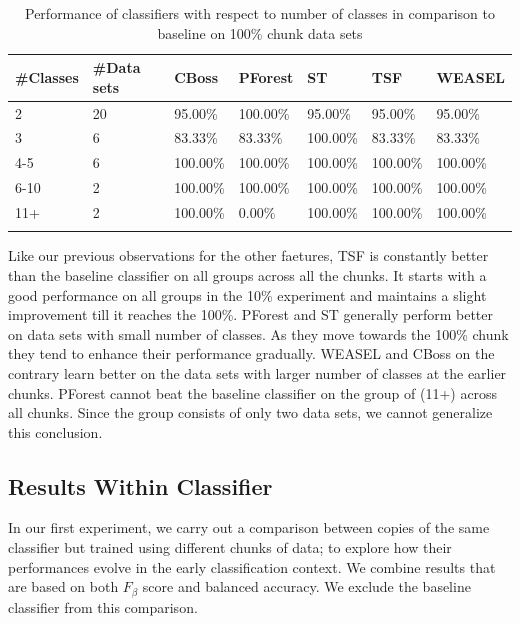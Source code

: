 \begin{table}[hp!]
	\setlength\extrarowheight{2pt} %
	\begin{tabularx}{\textwidth}{|X|X|X|X|X|X|X|}
	\hline
	\textbf{\#Classes} & \textbf{\#Data sets} & \textbf{CBoss} & \textbf{PForest} & \textbf{ST} & \textbf{TSF} & \textbf{WEASEL} \\ \hline
		2 & 20 & 95.00\% & 100.00\% & 95.00\% & 95.00\% & 95.00\% \\ \hline
		3 & 6 & 83.33\% & 83.33\% & 100.00\% & 83.33\% & 83.33\% \\ \hline
		4-5 & 6 & 100.00\% & 100.00\% & 100.00\% & 100.00\% & 100.00\% \\ \hline
		6-10 & 2 & 100.00\% & 100.00\% & 100.00\% & 100.00\% & 100.00\% \\ \hline
		11+ & 2 & 100.00\% & 0.00\% & 100.00\% & 100.00\% & 100.00\% \\ \hline
  \caption{Performance of classifiers with respect to number of classes in comparison to baseline on 100\% chunk data sets}
  \label{TableNumClass100}
  \end{tabularx}
\end{table}

Like our previous observations for the other faetures, TSF is constantly better than the baseline classifier on all groups across all the chunks.
It starts with a good performance on all groups in the 10\% experiment and maintains a slight improvement till it reaches the 100\%.
PForest and ST generally perform better on data sets with small number of classes. As they move towards the 100\% chunk they tend to enhance their performance gradually.
WEASEL and CBoss on the contrary learn better on the data sets with larger number of classes at the earlier chunks.
PForest cannot beat the baseline classifier on the group of (11+) across all chunks. Since the group consists of only two data sets, we cannot generalize this conclusion.


\subsection{Results Within Classifier}
\label{SubsectionWithinComparison}
In our first experiment, we carry out a comparison between copies of the same classifier but trained using different chunks of data;
to explore how their performances evolve in the early classification context. We combine results that are based on both $F_{\beta}$ score and balanced accuracy.
We exclude the baseline classifier from this comparison.


